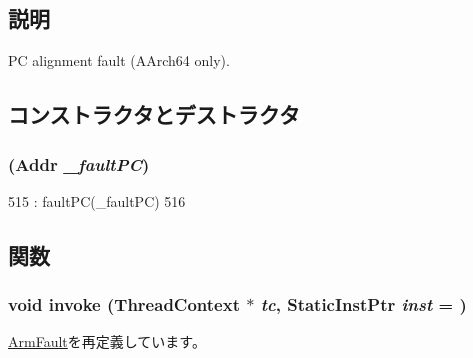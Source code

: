 \subsection{説明}
PC alignment fault (AArch64 only). 

\subsection{コンストラクタとデストラクタ}
\hypertarget{classArmISA_1_1PCAlignmentFault_a16a334acc3968c1fc6cbeed896fae45c}{
\subsubsection[{PCAlignmentFault}]{ ({\bf Addr} {\em \_\-faultPC})}}
\label{classArmISA_1_1PCAlignmentFault_a16a334acc3968c1fc6cbeed896fae45c}



\begin{DoxyCode}
515                                     : faultPC(_faultPC)
516     {}
\end{DoxyCode}


\subsection{関数}
\hypertarget{classArmISA_1_1PCAlignmentFault_a2bd783b42262278d41157d428e1f8d6f}{
\subsubsection[{invoke}]{\setlength{\rightskip}{0pt plus 5cm}void invoke ({\bf ThreadContext} $\ast$ {\em tc}, \/  {\bf StaticInstPtr} {\em inst} = {})}}
\label{classArmISA_1_1PCAlignmentFault_a2bd783b42262278d41157d428e1f8d6f}


\hyperlink{classArmISA_1_1ArmFault_a2bd783b42262278d41157d428e1f8d6f}{ArmFault}を再定義しています。


